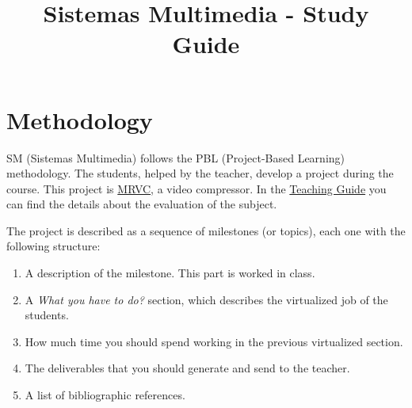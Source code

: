 \title{Sistemas Multimedia - Study Guide}

\maketitle

\section{Methodology}
SM (Sistemas Multimedia) follows the PBL (Project-Based Learning)
methodology. The students, helped by the teacher, develop a project
during the course. This project is
\href{https://github.com/Sistemas-Multimedia/MRVC}{MRVC}, a video
compressor. In the
\href{http://portafirma.ual.es/pfirma/downloadReport/file?idDocument=Y3iGKKA5Lb&idRequest=vo8X8SLOXQ}{Teaching
  Guide} you can find the details about the evaluation of the subject.

The project is described as a sequence of milestones (or topics), each
one with the following structure:
\begin{enumerate}
\item A description of the milestone. This part is worked in class.
\item A \emph{What you have to do?} section, which describes the
  virtualized job of the students.
\item How much time you should spend working in the previous
  virtualized section.
\item The deliverables that you should generate and send to the
  teacher.
\item A list of bibliographic references.
\end{enumerate}

